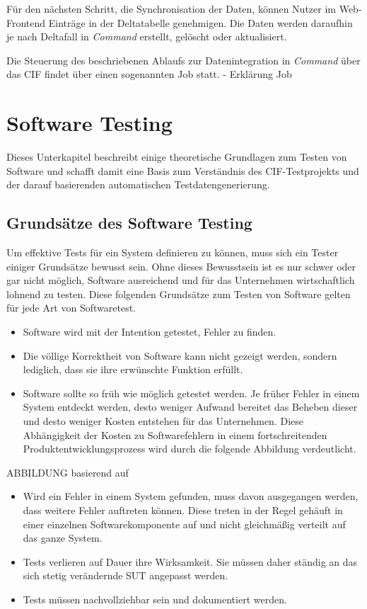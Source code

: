 Für den nächsten Schritt, die Synchronisation der Daten, können Nutzer im Web-Frontend Einträge in der Deltatabelle genehmigen. Die Daten werden daraufhin je nach Deltafall in \textit{Command} erstellt, gelöscht oder aktualisiert.
 
Die Steuerung des beschriebenen Ablaufs zur Datenintegration in \textit{Command} über das \ac{CIF} findet über einen sogenannten Job statt.
- Erklärung Job

\section{Software Testing}\label{sec:swtesting}
Dieses Unterkapitel beschreibt einige theoretische Grundlagen zum Testen von Software und schafft damit eine Basis zum Verständnis des \ac{CIF}-Testprojekts und der darauf basierenden automatischen Testdatengenerierung.

\subsection{Grundsätze des Software Testing}\label{subsec:testinginqa}
Um effektive Tests für ein System definieren zu können, muss sich ein Tester einiger Grundsätze bewusst sein. Ohne dieses Bewusstsein ist es nur schwer oder gar nicht möglich, Software ausreichend und für das Unternehmen wirtschaftlich lohnend zu testen. Diese folgenden Grundsätze zum Testen von Software gelten für jede Art von Softwaretest.
\begin{itemize}
    \item Software wird mit der Intention getestet, Fehler zu finden. \cite[S. 6]{myers:2011}\cite[S. 11]{witte:2019}
    \item Die völlige Korrektheit von Software kann nicht gezeigt werden, sondern lediglich, dass sie ihre erwünschte Funktion erfüllt. \cite[S. 19]{ammann:2016}\cite[S. 12]{witte:2019}
    \item Software sollte so früh wie möglich getestet werden. Je früher Fehler in einem System entdeckt werden, desto weniger Aufwand bereitet das Beheben dieser und desto weniger Kosten entstehen für das Unternehmen. \cite[S. 12]{witte:2019} Diese Abhängigkeit der Kosten zu Softwarefehlern in einem fortschreitenden Produktentwicklungsprozess wird durch die folgende Abbildung verdeutlicht.
\end{itemize}

ABBILDUNG basierend auf \cite[Fig. 1.3]{desikan:2006}

\begin{itemize}
    \item Wird ein Fehler in einem System gefunden, muss davon ausgegangen werden, dass weitere Fehler auftreten können. Diese treten in der Regel gehäuft in einer einzelnen Softwarekomponente auf und nicht gleichmäßig verteilt auf das ganze System. \cite[S. 13]{witte:2019}
    \item Tests verlieren auf Dauer ihre Wirksamkeit. Sie müssen daher ständig an das sich stetig verändernde \ac{SUT} angepasst werden. \cite[S. 13f.]{witte:2019}
    \item Tests müssen nachvollziehbar sein und dokumentiert werden. \cite[S. 14f.]{witte:2019}
\end{itemize}

